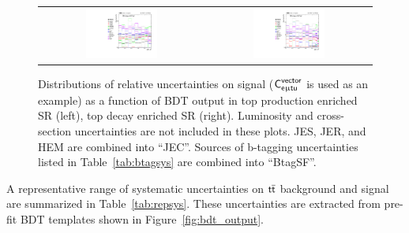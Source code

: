 \begin{figure}[tbh!]
 \begin{center}
 \begin{tabular}{cc}
  \includegraphics[width=0.45\textwidth]{figures/Part3/Systematics/sysBDT_ST_sig_2017}&
 \includegraphics[width=0.45\textwidth]{figures/Part3/Systematics/sysBDT_TT_sig_2017} \\
 \end{tabular}
 \caption{Distributions of relative uncertainties on signal ($\textsf{C}^{\textsf{vector}}_{\textsf{e}\upmu\textsf{t{u}}}$ is used as an example) as a function of \ac{BDT} output in top production enriched \ac{SR} (left), top decay enriched \ac{SR} (right). Luminosity and cross-section uncertainties are not included in these plots. \ac{JES}, \ac{JER}, and HEM are combined into ``JEC''. Sources of b-tagging uncertainties listed in Table~\ref{tab:btagsys} are combined into ``BtagSF''.}
 \label{fig:Comp_sys_signal}
 \end{center}
\end{figure}

A representative range of systematic uncertainties on $\textsf{t}\overline{\textsf{t}}$ background and signal are summarized in Table~\ref{tab:repsys}. These uncertainties are extracted from pre-fit \ac{BDT} templates shown in Figure~\ref{fig:bdt_output}.

